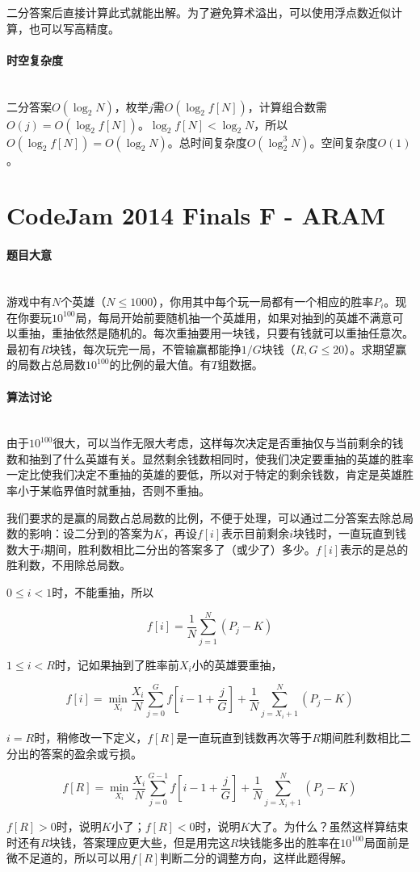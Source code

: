 \documentclass[UTF8]{ctexart}
\newcommand{\myparagraph}[1]{\paragraph{#1}\mbox{}\\}
\theoremstyle{nonumberplain}
\begin{document}
			二分答案后直接计算此式就能出解。为了避免算术溢出，可以使用浮点数近似计算，也可以写高精度。
		
		\myparagraph{时空复杂度}
		
			二分答案$O(\log_2N)$，枚举$j$需$O(\log_2{f[N]})$，计算组合数需$O(j)=O(\log_2{f[N]})$。$\log_2{f[N]}<\log_2N$，所以$O(\log_2{f[N]})=O(\log_2N)$。总时间复杂度$O(\log_2^3{N})$。空间复杂度$O(1)$。
	
	\section{CodeJam 2014 Finals F - ARAM}
	
		\myparagraph{题目大意}
		
			游戏中有$N$个英雄（$N \leq 1000$），你用其中每个玩一局都有一个相应的胜率$P_i$。现在你要玩$10^{100}$局，每局开始前要随机抽一个英雄用，如果对抽到的英雄不满意可以重抽，重抽依然是随机的。每次重抽要用一块钱，只要有钱就可以重抽任意次。最初有$R$块钱，每次玩完一局，不管输赢都能挣$1/G$块钱（$R,G \leq 20$）。求期望赢的局数占总局数$10^{100}$的比例的最大值。有$T$组数据。
		
		\myparagraph{算法讨论}
		
			由于$10^{100}$很大，可以当作无限大考虑，这样每次决定是否重抽仅与当前剩余的钱数和抽到了什么英雄有关。显然剩余钱数相同时，使我们决定要重抽的英雄的胜率一定比使我们决定不重抽的英雄的要低，所以对于特定的剩余钱数，肯定是英雄胜率小于某临界值时就重抽，否则不重抽。
			
			我们要求的是赢的局数占总局数的比例，不便于处理，可以通过二分答案去除总局数的影响：设二分到的答案为$K$，再设$f[i]$表示目前剩余$i$块钱时，一直玩直到钱数大于$i$期间，胜利数相比二分出的答案多了（或少了）多少。$f[i]$表示的是总的胜利数，不用除总局数。
			
			$0 \leq i < 1$时，不能重抽，所以
			
			$$f[i]=\frac{1}{N}\sum_{j=1}^N(P_j-K)$$
			
			$1 \leq i < R$时，记如果抽到了胜率前$X_i$小的英雄要重抽，
			
			$$f[i]=\min_{X_i} \frac{X_i}{N}\sum_{j=0}^G f[i-1+\frac{j}{G}] + \frac{1}{N}\sum_{j=X_i+1}^N(P_j-K)$$
			
			$i=R$时，稍修改一下定义，$f[R]$是一直玩直到钱数再次等于$R$期间胜利数相比二分出的答案的盈余或亏损。
			
			$$f[R]=\min_{X_i} \frac{X_i}{N}\sum_{j=0}^{G-1} f[i-1+\frac{j}{G}] + \frac{1}{N}\sum_{j=X_i+1}^N(P_j-K)$$
			
			$f[R]>0$时，说明$K$小了；$f[R]<0$时，说明$K$大了。为什么？虽然这样算结束时还有$R$块钱，答案理应更大些，但是用完这$R$块钱能多出的胜率在$10^{100}$局面前是微不足道的，所以可以用$f[R]$判断二分的调整方向，这样此题得解。
		
\end{document}
